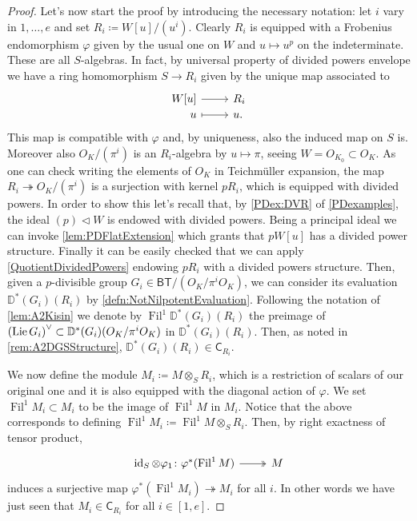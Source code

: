 \begin{proof}
Let's now start the proof by introducing the necessary notation:
let $i$ vary in $1, \ldots, e$ and set $R_i \coloneqq W[u]/ (u^i)$.
Clearly $R_i$ is equipped with a Frobenius endomorphism $\varphi$
given by the usual one on $W$ and $u \mapsto u^p$ on the indeterminate.
These are all $S$-algebras.
In fact, by universal property of divided powers envelope
we have a ring homomorphism $S \to R_i$ given by the unique map associated to
\begin{equation*}
\begin{tikzcd}[row sep = 0ex
	,/tikz/column 1/.append style={anchor=base east}
	,/tikz/column 2/.append style={anchor=base west}]
	W[u] \arrow[r, "", rightarrow] &
	R_i \\
	u \arrow[r, "", mapsto] & u.
\end{tikzcd}
\end{equation*} 
This map is compatible with $\varphi$ and, by uniqueness, also
the induced map on $S$ is.
Moreover also $O_K/ (\pi^i)$ is an $R_i$-algebra by $u \mapsto \pi$,
seeing $W = O_{K_0} \subset O_K$.
As one can check writing the elements of $O_K$ in Teichmüller expansion,
the map $R_i \twoheadrightarrow O_K/ (\pi^i)$ is a surjection
with kernel $pR_i$, which is equipped with divided powers.
In order to show this let's recall that, by \cref{PDex:DVR} of
\cref{PDexamples}, the ideal \((p) \triangleleft W\) is endowed with divided powers.
Being a principal ideal we can invoke \cref{lem:PDFlatExtension} 
which grants that \(pW[u]\) has a divided power structure.
Finally it can be easily checked that we can apply \cref{QuotientDividedPowers}
endowing \(pR_i\) with a divided powers structure.
Then, given a $p$-divisible group $G_i \in \mathsf{BT}/ (O_K/ \pi^iO_K)$,
we can consider its evaluation $\mathbb{D}^*(G_i)(R_i)$ by \cref{defn:NotNilpotentEvaluation}.
Following the notation of \cref{lem:A2Kisin}
we denote by $\operatorname{Fil}^1\mathbb{D}^*(G_i)(R_i)$
the preimage of $\left( \operatorname{Lie} G_i \right)^\vee \subset \mathbb{D}^*(G_i)(O_K/\pi^iO_K)$
in $\mathbb{D}^*(G_i)(R_i)$.
Then, as noted in \cref{rem:A2DGSStructure},
\(\mathbb{D}^*(G_i)(R_i) \in \mathsf{C}_{ R_i }\).

We now define the module $M_i \coloneqq M \otimes_S R_i$,
which is a restriction of scalars of our original one and
it is also equipped with the diagonal action of $\varphi$.
We set $\operatorname{Fil}^1 M_i \subset M_i$
to be the image of $\operatorname{Fil}^1 M$ in $M_i$.
Notice that the above corresponds to defining $\operatorname{Fil}^1 M_i \coloneqq
\operatorname{Fil}^1 M \otimes_S R_i$.
Then, by right exactness of tensor product, 
\begin{equation*}
\begin{tikzcd}[row sep = 0ex
	,/tikz/column 1/.append style={anchor=base east}
	,/tikz/column 2/.append style={anchor=base west}]
	\id_{ S } \otimes \varphi_1
	\colon 
	\varphi^*(\operatorname{Fil}^1 M)
	\arrow[r, "", twoheadrightarrow] &
	M
\end{tikzcd}
\end{equation*} 
induces a surjective map $\varphi^*(\operatorname{Fil}^1 M_i) \twoheadrightarrow M_i$
for all $i$.
In other words we have just seen that
$M_i \in \mathsf{C}_{R_i}$ for all $i \in [1,e]$.


\end{proof}
